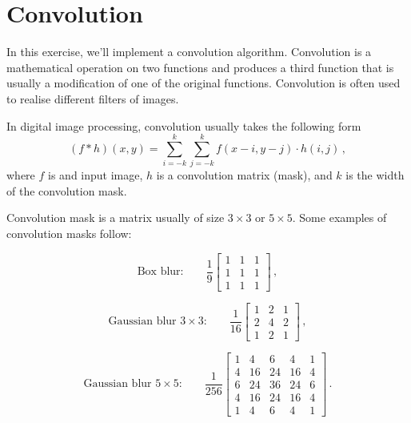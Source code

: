 \documentclass[12pt]{article}
\begin{document}
\section*{Convolution}

In this exercise, we'll implement a convolution algorithm. Convolution is a mathematical operation on two functions
and produces a third function that is usually a modification of one of the original functions.
Convolution is often used to realise different filters of images.

In digital image processing, convolution usually takes the following form
\begin{equation}
    \label{eq:tri}
    (f * h)(x, y) = \sum\limits_{i=-k}^{k} \sum\limits_{j=-k}^{k} f(x - i, y - j) \cdot h(i, j) \, ,
\end{equation}
where $f$ is and input image, $h$ is a convolution matrix (mask), and $k$ is the width of the convolution mask.

Convolution mask is a matrix usually of size $3 \times 3$ or $5 \times 5$. Some examples of convolution masks follow:

\begin{equation}
    \label{eq:box_blur}
    \text{Box blur:} \quad\quad \frac{1}{9}
    \begin{bmatrix}
        1 & 1 & 1 \\
        1 & 1 & 1 \\
        1 & 1 & 1
    \end{bmatrix}
    \, ,
\end{equation}

\begin{equation}
    \label{eq:gauss_blur_3}
    \text{Gaussian blur $3 \times 3$:} \quad\quad \frac{1}{16}
    \begin{bmatrix}
        1 & 2 & 1 \\
        2 & 4 & 2 \\
        1 & 2 & 1
    \end{bmatrix}
    \, ,
\end{equation}

\begin{equation}
    \label{eq:gauss_blur_5}
    \text{Gaussian blur $5 \times 5$:} \quad\quad \frac{1}{256}
    \begin{bmatrix}
        1 & 4  & 6  & 4  & 1 \\
        4 & 16 & 24 & 16 & 4 \\
        6 & 24 & 36 & 24 & 6 \\
        4 & 16 & 24 & 16 & 4 \\
        1 & 4  & 6  & 4  & 1
    \end{bmatrix}
    \, .
\end{equation}
\end{document}
